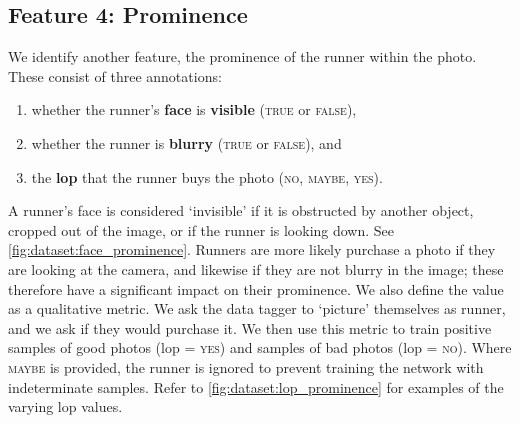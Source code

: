 %

\subsection{Feature 4: Prominence}

We identify another feature, the prominence of the runner within the photo. These consist of three annotations:

\begin{enumerate}
  \item whether the runner's \textbf{face} is \textbf{visible} (\textsc{true} or \textsc{false}),
  \item whether the runner is \textbf{blurry} (\textsc{true} or \textsc{false}), and
  \item the \textbf{\gls{lop}} that the runner buys the photo (\textsc{no}, \textsc{maybe}, \textsc{yes}).
\end{enumerate}

A runner's face is considered `invisible' if it is obstructed by another object, cropped out of the image, or if the runner is looking down. See \cref{fig:dataset:face_prominence}. Runners are more likely purchase a photo if they are looking at the camera, and likewise if they are not blurry in the image; these therefore have a significant impact on their prominence. We also define the  value as a qualitative metric. We ask the data tagger to `picture' themselves as runner, and we ask if they would purchase it. We then use this metric to train positive samples of good photos (\gls{lop} = \textsc{yes}) and samples of bad photos (\gls{lop} = \textsc{no}). Where \textsc{maybe} is provided, the runner is ignored to prevent training the network with indeterminate samples. Refer to \cref{fig:dataset:lop_prominence} for examples of the varying \gls{lop} values. 

